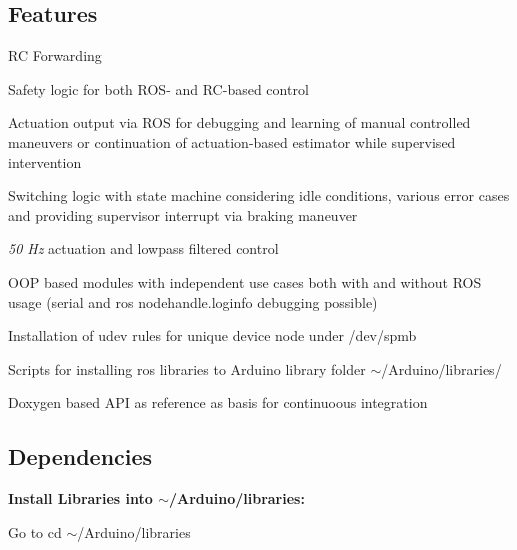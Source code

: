 \subsection*{Features}


\begin{DoxyItemize}
\item RC Forwarding
\item Safety logic for both R\+O\+S-\/ and R\+C-\/based control
\item Actuation output via R\+OS for debugging and learning of manual controlled maneuvers or continuation of actuation-\/based estimator while supervised intervention
\item Switching logic with state machine considering idle conditions, various error cases and providing supervisor interrupt via braking maneuver
\item {\itshape 50 Hz} actuation and lowpass filtered control
\item O\+OP based modules with independent use cases both with and without R\+OS usage (serial and ros nodehandle.\+loginfo debugging possible)
\item Installation of udev rules for unique device node under {\ttfamily /dev/spmb}
\item Scripts for installing ros libraries to Arduino library folder {\ttfamily $\sim$/\+Arduino/libraries/}
\item Doxygen based A\+PI as reference as basis for continuoous integration
\end{DoxyItemize}

\subsection*{Dependencies}

{\bfseries Install Libraries into {\ttfamily $\sim$/\+Arduino/libraries}\+:}

Go to {\ttfamily cd $\sim$/\+Arduino/libraries}


